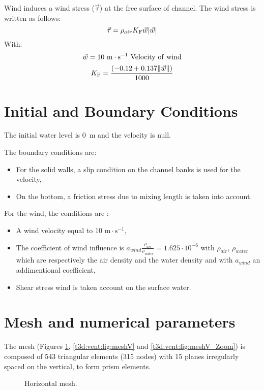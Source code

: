 \bigskip
Wind induces a wind stress ($\vec{\tau}$) at the free surface of channel.
The wind stress is written as follows:
\begin{equation*}
\vec{\tau}=\rho_{air}K_{\rm{F}} \vec w |\vec w|
\end{equation*}
With:
\begin{equation*}
\vec w = 10~\text{m}\cdot\text{s}^{-1}\rm{~Velocity~of~wind}
\end{equation*}
\begin{equation*}
K_{\rm{F}} = \frac{(-0.12 + 0.137 \| \vec w \| )}{1000}
\end{equation*}

\section{Initial and Boundary Conditions}

\bigskip
The initial water level is 0~m and the velocity is null.

\bigskip
The boundary conditions are:
\begin{itemize}
\item For the solid walls, a slip condition on the channel banks is used
for the velocity,
\item On the bottom, a friction stress due to mixing length is taken into account.
\end{itemize}
For the wind, the conditions are :
\begin{itemize}
\item A wind velocity equal to 10 $\text{m}\cdot\text{s}^{-1}$,
\item The coefficient of wind influence is $a_{wind} \frac{\rho_{air}}
{\rho_{water}} = 1.625 \cdot 10^{-6}$ with $\rho_{air}$, $\rho_{water}$
which are respectively the air density and the water density and
with $a_{wind}$ an addimentional coefficient,
\item Shear stress wind is taken account on the surface water.
\end{itemize}

\section{Mesh and numerical parameters}
\bigskip
The mesh (Figures \ref{t3d:vent:fig:meshH}, \ref{t3d:vent:fig:meshV} and
\ref{t3d:vent:fig:meshV_Zoom})  is composed of 543 triangular elements
(315 nodes) with 15 planes  irregularly spaced on the vertical, to form prism elements.

\begin{figure}[!htbp]
 \centering
 \caption{Horizontal mesh.}
 \label{t3d:vent:fig:meshH}
\end{figure}

